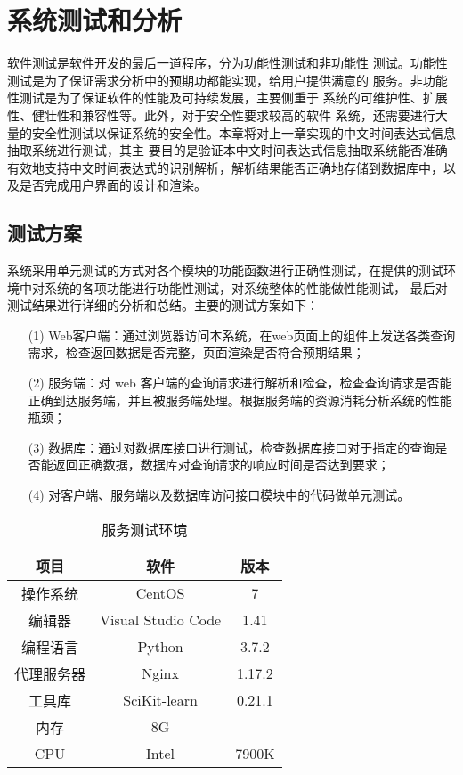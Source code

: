 
\chapter{系统测试和分析}

软件测试是软件开发的最后一道程序，分为功能性测试和非功能性
测试。功能性测试是为了保证需求分析中的预期功都能实现，给用户提供满意的
服务。非功能性测试是为了保证软件的性能及可持续发展，主要侧重于
系统的可维护性、扩展性、健壮性和兼容性等。此外，对于安全性要求较高的软件
系统，还需要进行大量的安全性测试以保证系统的安全性。本章将对上一章实现的中文时间表达式信息抽取系统进行测试，其主
要目的是验证本中文时间表达式信息抽取系统能否准确有效地支持中文时间表达式的识别解析，解析结果能否正确地存储到数据库中，以及是否完成用户界面的设计和渲染。

\section{测试方案}

系统采用单元测试的方式对各个模块的功能函数进行正确性测试，在提供的测试环境中对系统的各项功能进行功能性测试，对系统整体的性能做性能测试，
最后对测试结果进行详细的分析和总结。主要的测试方案如下：

\begin{enumerate}
    \item[(1)] Web客户端：通过浏览器访问本系统，在web页面上的组件上发送各类查询需求，检查返回数据是否完整，页面渲染是否符合预期结果；
    \item[(2)] 服务端：对 web 客户端的查询请求进行解析和检查，检查查询请求是否能正确到达服务端，并且被服务端处理。根据服务端的资源消耗分析系统的性能瓶颈；
    \item[(3)] 数据库：通过对数据库接口进行测试，检查数据库接口对于指定的查询是否能返回正确数据，数据库对查询请求的响应时间是否达到要求；
    \item[(4)] 对客户端、服务端以及数据库访问接口模块中的代码做单元测试。
\end{enumerate}

\begin{table}[h]
    \centering
    \caption{服务测试环境}
    \begin{tabular}{|*{3}{c|}}
        \hline
        项目       & 软件               & 版本   \\
        \hline
        操作系统   & CentOS             & 7      \\
        \hline
        编辑器     & Visual Studio Code & 1.41   \\
        编程语言   & Python             & 3.7.2  \\
        \hline
        代理服务器 & Nginx              & 1.17.2 \\
        \hline
        工具库     & SciKit-learn       & 0.21.1 \\
        \hline
        内存       & 8G                 &        \\
        \hline
        CPU        & Intel              & 7900K  \\
        \hline
    \end{tabular}
    \label{tab:server_test}
\end{table}


